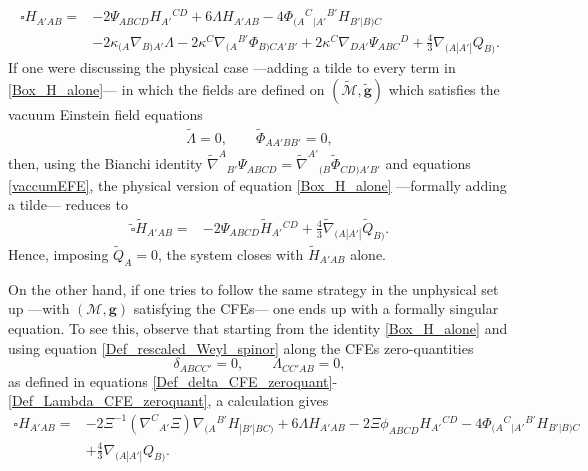 \documentclass[10pt,a4paper]{article}
\theoremstyle{plain}
\def\bmg{{\bm g}}
\begin{document}
\begin{align}\label{Box_H_alone}
\square H_{A'AB} = & -2 \Psi _{ABCD} H_{A'}{}^{CD} + 6 \Lambda
H_{A'AB} -4 \Phi _{(A}{}^{C}{}_{|A'}{}^{B'}H_{B'|B)C} \nonumber \\ &
-2 \kappa _{(A}\nabla_{B)A'}\Lambda -2
\kappa^{C}\nabla_{(A}{}^{B'}\Phi _{B)CA'B'} + 2 \kappa ^{C}
\nabla_{DA'}\Psi _{ABC}{}^{D} + \tfrac{4}{3} \nabla_{(A|A'|}Q_{B)}.
\end{align}
If one were discussing the physical case ---adding a tilde to every
term in \eqref{Box_H_alone}--- in which the fields are defined on
$(\tilde{\mathcal{M}},\tilde{\bmg})$ which satisfies the vacuum
Einstein field equations
\begin{align}\label{vaccumEFE}
  \tilde{\Lambda}=0, \qquad \tilde{\Phi}_{AA'BB'}=0,
\end{align}
then, using the Bianchi identity $\tilde{\nabla}^{A}{}_{B'}\Psi
_{ABCD}=\tilde{\nabla}^{A'}{}_{(B}\tilde{\Phi}_{CD)A'B'}$ and
equations \eqref{vaccumEFE},
the physical version of equation \eqref{Box_H_alone} ---formally adding a tilde---
reduces to
\begin{align}\label{Box_H_alone_physical}
  \tilde{\square} \tilde{H}_{A'AB} = & -2 \Psi _{ABCD} \tilde{H}_{A'}{}^{CD}
  + \tfrac{4}{3} \tilde{\nabla}_{(A|A'|}\tilde{Q}_{B)}.
\end{align}
Hence, imposing $\tilde{Q}_A=0$, the system
closes with $\tilde{H}_{A'AB}$ alone.


\medskip

On the other hand, if one tries to follow the same strategy in the unphysical set up
---with $(\mathcal{M},\bmg)$ satisfying the CFEs--- one ends up with a
formally singular equation. To see this, observe that starting from
the identity \eqref{Box_H_alone} and using equation \eqref{Def_rescaled_Weyl_spinor}
along the CFEs zero-quantities
\[ \delta_{ABCC'}=0, \qquad \Lambda_{CC'AB}=0,\]
as defined in equations \eqref{Def_delta_CFE_zeroquant}-\eqref{Def_Lambda_CFE_zeroquant},
a calculation gives
\begin{align}\label{WaveH_twistor_singular}
  \square H_{A'AB} = & - 2\Xi^{-1} (\nabla^{C}{}_{A'}\Xi)
    \nabla_{(A}{}^{B'}H_{|B'|BC)}+ 6 \Lambda H_{A'AB} -2 \Xi
  \phi _{ABCD}H_{A'}{}^{CD} -4
  \Phi_{(A}{}^{C}{}_{|A'}{}^{B'}H_{B'|B)C} \nonumber \\ & +
  \tfrac{4}{3} \nabla_{(A|A'|}Q_{B)}.
\end{align}
\end{document}
